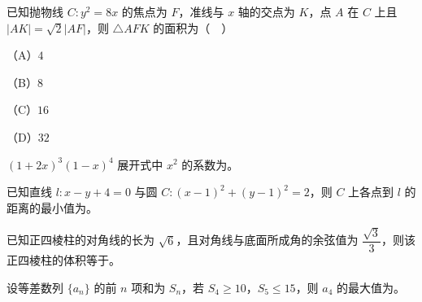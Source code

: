 \begin{question}
已知抛物线 $C:y^2=8x$ 的焦点为 $F$，准线与 $x$ 轴的交点为 $K$，点 $A$ 在 $C$ 上且 $|AK|=\sqrt2|AF|$，则 $\triangle AFK$ 的面积为（　）

（A）$4$

（B）$8$

（C）$16$

（D）$32$

\end{question}

\begin{question}
$(1+2x)^3(1-x)^4$ 展开式中 $x^2$ 的系数为\gkblank{}。

\end{question}
\begin{question}
已知直线 $l:x-y+4=0$ 与圆 $C:(x-1)^2+(y-1)^2=2$，则 $C$ 上各点到 $l$ 的距离的最小值为\gkblank{}。

\end{question}
\begin{question}
已知正四棱柱的对角线的长为 $\sqrt6$，且对角线与底面所成角的余弦值为 $\dfrac{\sqrt3}3$，则该正四棱柱的体积等于\gkblank{}。

\end{question}
\begin{question}
设等差数列 $\{a_n\}$ 的前 $n$ 项和为 $S_n$，若 $S_4\geqslant10$，$S_5\leqslant15$，则 $a_4$ 的最大值为\gkblank{}。

\end{question}

